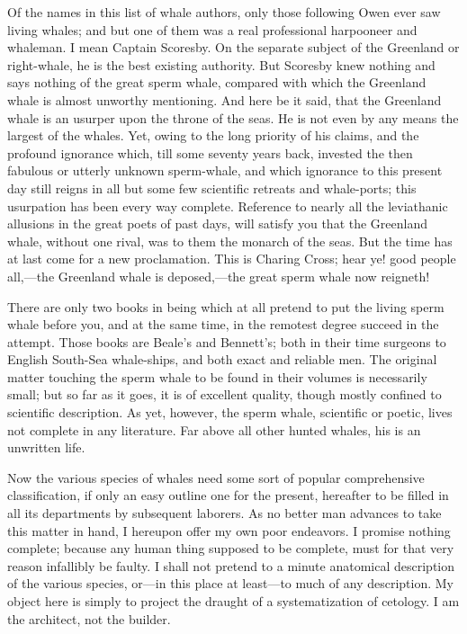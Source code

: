 Of the names in this list of whale authors, only those following Owen ever saw living whales; and but one of them was a real professional harpooneer and whaleman. I mean Captain Scoresby. On the separate subject of the Greenland or right-whale, he is the best existing authority. But Scoresby knew nothing and says nothing of the great sperm whale, compared with which the Greenland whale is almost unworthy mentioning. And here be it said, that the Greenland whale is an usurper upon the throne of the seas. He is not even by any means the largest of the whales. Yet, owing to the long priority of his claims, and the profound ignorance which, till some seventy years back, invested the then fabulous or utterly unknown sperm-whale, and which ignorance to this present day still reigns in all but some few scientific retreats and whale-ports; this usurpation has been every way complete. Reference to nearly all the leviathanic allusions in the great poets of past days, will satisfy you that the Greenland whale, without one rival, was to them the monarch of the seas. But the time has at last come for a new proclamation. This is Charing Cross; hear ye! good people all,---the Greenland whale is deposed,---the great sperm whale now reigneth!

There are only two books in being which at all pretend to put the living sperm whale before you, and at the same time, in the remotest degree succeed in the attempt. Those books are Beale’s and Bennett’s; both in their time surgeons to English South-Sea whale-ships, and both exact and reliable men. The original matter touching the sperm whale to be found in their volumes is necessarily small; but so far as it goes, it is of excellent quality, though mostly confined to scientific description. As yet, however, the sperm whale, scientific or poetic, lives not complete in any literature. Far above all other hunted whales, his is an unwritten life.

Now the various species of whales need some sort of popular comprehensive classification, if only an easy outline one for the present, hereafter to be filled in all its departments by subsequent laborers. As no better man advances to take this matter in hand, I hereupon offer my own poor endeavors. I promise nothing complete; because any human thing supposed to be complete, must for that very reason infallibly be faulty. I shall not pretend to a minute anatomical description of the various species, or---in this place at least—to much of any description. My object here is simply to project the draught of a systematization of cetology. I am the architect, not the builder.

